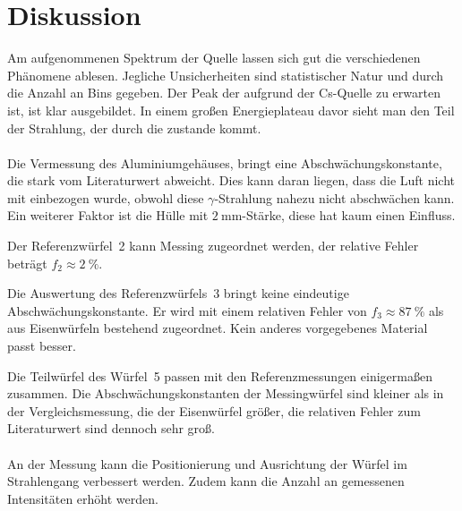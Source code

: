 \section{Diskussion}
\label{sec:Diskussion}

Am aufgenommenen Spektrum der Quelle lassen sich gut die verschiedenen Phänomene ablesen. Jegliche Unsicherheiten sind statistischer Natur und durch die Anzahl an Bins gegeben.
Der Peak der aufgrund der Cs-Quelle zu erwarten ist, ist klar ausgebildet.
In einem großen Energieplateau davor sieht man den Teil der Strahlung, der durch die  zustande kommt.
\\~\\
Die Vermessung des Aluminiumgehäuses, bringt eine Abschwächungskonstante, die stark vom Literaturwert abweicht.
Dies kann daran liegen, dass die Luft nicht mit einbezogen wurde, obwohl diese $γ$-Strahlung nahezu nicht abschwächen kann.
Ein weiterer Faktor ist die Hülle mit $\SI{2}{\milli\meter}$-Stärke,
diese hat kaum einen Einfluss.

Der Referenzwürfel~2 kann Messing zugeordnet werden,
der relative Fehler beträgt $f_2\approx\SI{2}{\percent}$.

Die Auswertung des Referenzwürfels~3 bringt keine eindeutige Abschwächungskonstante.
Er wird mit einem relativen Fehler von
$f_3\approx\SI{87}{\percent}$ als aus Eisenwürfeln bestehend zugeordnet.
Kein anderes vorgegebenes Material passt besser.

Die Teilwürfel des Würfel~5 passen mit den Referenzmessungen einigermaßen zusammen.
Die Abschwächungskonstanten der Messingwürfel sind kleiner als in der Vergleichsmessung,
die der Eisenwürfel größer, die relativen Fehler zum Literaturwert sind dennoch sehr groß.
\\~\\
An der Messung kann die Positionierung und Ausrichtung der Würfel im Strahlengang verbessert werden.
Zudem kann die Anzahl an gemessenen Intensitäten erhöht werden.
